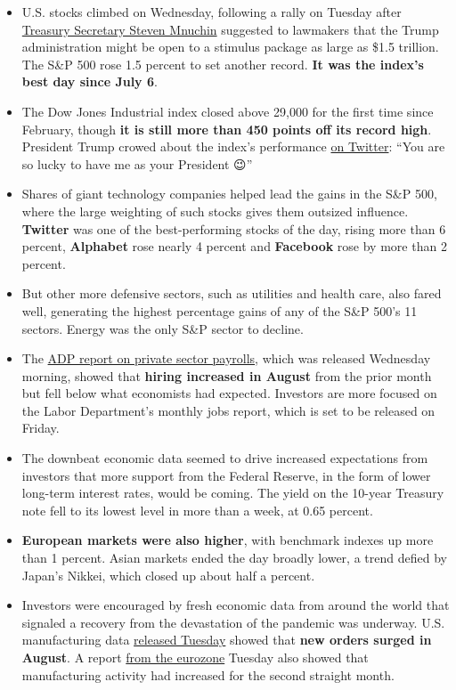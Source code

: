 \begin{itemize}
\item
  U.S. stocks climbed on Wednesday, following a rally on Tuesday after
  \href{https://www.nytimes3xbfgragh.onion/2020/09/01/business/economy/mnuchin-coronavirus.html}{Treasury
  Secretary Steven Mnuchin} suggested to lawmakers that the Trump
  administration might be open to a stimulus package as large as \$1.5
  trillion. The S\&P 500 rose 1.5 percent to set another record.
  \textbf{It was the index's best day since July 6}.
\item
  The Dow Jones Industrial index closed above 29,000 for the first time
  since February, though \textbf{it is still more than 450 points off
  its record high}. President Trump crowed about the index's performance
  \href{https://twitter.com/realDonaldTrump/status/1301249968091455488}{on
  Twitter}: ``You are so lucky to have me as your President 😉''
\item
  Shares of giant technology companies helped lead the gains in the S\&P
  500, where the large weighting of such stocks gives them outsized
  influence. \textbf{Twitter} was one of the best-performing stocks of
  the day, rising more than 6 percent, \textbf{Alphabet} rose nearly 4
  percent and \textbf{Facebook} rose by more than 2 percent.
\item
  But other more defensive sectors, such as utilities and health care,
  also fared well, generating the highest percentage gains of any of the
  S\&P 500's 11 sectors. Energy was the only S\&P sector to decline.
\item
  The
  \href{https://adpemploymentreport.com/2020/August/NER/NER-August-2020.aspx}{ADP
  report on private sector payrolls}, which was released Wednesday
  morning, showed that \textbf{hiring increased in August} from the
  prior month but fell below what economists had expected. Investors are
  more focused on the Labor Department's monthly jobs report, which is
  set to be released on Friday.
\item
  The downbeat economic data seemed to drive increased expectations from
  investors that more support from the Federal Reserve, in the form of
  lower long-term interest rates, would be coming. The yield on the
  10-year Treasury note fell to its lowest level in more than a week, at
  0.65 percent.
\item
  \textbf{European markets were also higher}, with benchmark indexes up
  more than 1 percent. Asian markets ended the day broadly lower, a
  trend defied by Japan's Nikkei, which closed up about half a percent.
\item
  Investors were encouraged by fresh economic data from around the world
  that signaled a recovery from the devastation of the pandemic was
  underway. U.S. manufacturing data
  \href{https://www.nytimes3xbfgragh.onion/reuters/2020/09/01/business/01reuters-usa-economy.html}{released
  Tuesday} showed that \textbf{new orders surged in August}. A report
  \href{https://www.nytimes3xbfgragh.onion/reuters/2020/09/01/us/01reuters-eurozone-economy-pmi.html?searchResultPosition=5}{from
  the eurozone} Tuesday also showed that manufacturing activity had
  increased for the second straight month.
\end{itemize}


